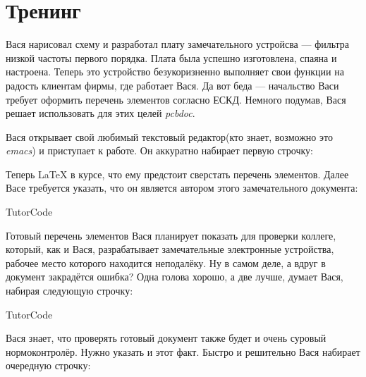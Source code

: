 
\section{Тренинг}

Вася нарисовал схему и разработал плату замечательного устройсва --- фильтра
низкой частоты первого порядка. Плата была успешно изготовлена, спаяна и
настроена. Теперь это устройство безукоризненно выполняет свои функции на радость
клиентам фирмы, где работает Вася. Да вот беда --- начальство Васи требует
оформить перечень элементов согласно ЕСКД. Немного подумав, Вася решает
использовать для этих целей \emph{pcbdoc}.

Вася открывает свой любимый текстовый редактор(кто знает, возможно это
\emph{emacs}) и приступает к работе. Он аккуратно набирает первую строчку:



Теперь \LaTeX{} в курсе, что ему предстоит сверстать перечень элементов.
Далее Васе требуется указать, что он является автором этого замечательного
документа:

\begin{SaveVerbatim}{TutorCode}
\end{SaveVerbatim}
\colorbox{codecolor}{}

Готовый перечень элементов Вася планирует показать для проверки коллеге, который,
как и Вася, разрабатывает замечательные электронные устройства, рабочее место
которого находится неподалёку. Ну в самом деле, а вдруг в документ закрадётся
ошибка? Одна голова хорошо, а две лучше, думает Вася, набирая следующую
строчку:

\begin{SaveVerbatim}{TutorCode}
\end{SaveVerbatim}
\colorbox{codecolor}{}

Вася знает, что проверять готовый документ также будет и очень суровый
нормоконтролёр. Нужно указать и этот факт. Быстро и решительно Вася набирает
очередную строчку:

